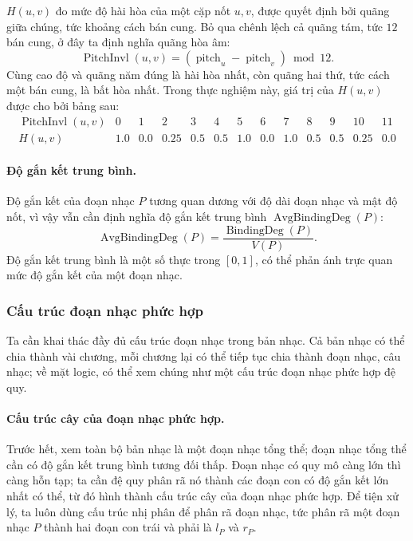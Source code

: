 \documentclass[11pt]{article}
\begin{document}
\(H(u,v)\) đo mức độ hài hòa của một cặp nốt \(u,v\), được quyết định bởi
quãng giữa chúng, tức khoảng cách bán cung. Bỏ qua chênh lệch cả quãng tám,
tức \(12\) bán cung, ở đây ta định nghĩa quãng hòa âm:
\[
  \operatorname{PitchInvl}(u,v)=
  (\operatorname{pitch}_u-\operatorname{pitch}_v)\bmod 12.
\]
Cùng cao độ và quãng năm đúng là hài hòa nhất, còn quãng hai thứ, tức cách
một bán cung, là bất hòa nhất. Trong thực nghiệm này, giá trị của \(H(u,v)\)
được cho bởi bảng sau:
\[
\begin{array}{c|cccccccccccc}
\operatorname{PitchInvl}(u,v) & 0&1&2&3&4&5&6&7&8&9&10&11\\
\hline
H(u,v)&1.0&0.0&0.25&0.5&0.5&1.0&0.0&1.0&0.5&0.5&0.25&0.0
\end{array}
\]

\paragraph{Độ gắn kết trung bình.}
Độ gắn kết của đoạn nhạc \(P\) tương quan dương với độ dài đoạn nhạc và mật
độ nốt, vì vậy vẫn cần định nghĩa độ gắn kết trung bình
\(\operatorname{AvgBindingDeg}(P)\):
\[
  \operatorname{AvgBindingDeg}(P)=
  \frac{\operatorname{BindingDeg}(P)}{V(P)}.
\]
Độ gắn kết trung bình là một số thực trong \([0,1]\), có thể phản ánh trực
quan mức độ gắn kết của một đoạn nhạc.

\subsubsection{Cấu trúc đoạn nhạc phức hợp}

Ta cần khai thác đầy đủ cấu trúc đoạn nhạc trong bản nhạc. Cả bản nhạc có thể
chia thành vài chương, mỗi chương lại có thể tiếp tục chia thành đoạn nhạc,
câu nhạc; về mặt logic, có thể xem chúng như một cấu trúc đoạn nhạc phức hợp
đệ quy.

\paragraph{Cấu trúc cây của đoạn nhạc phức hợp.}
Trước hết, xem toàn bộ bản nhạc là một đoạn nhạc tổng thể; đoạn nhạc tổng thể
cần có độ gắn kết trung bình tương đối thấp. Đoạn nhạc có quy mô càng lớn thì
càng hỗn tạp; ta cần đệ quy phân rã nó thành các đoạn con có độ gắn kết lớn
nhất có thể, từ đó hình thành cấu trúc cây của đoạn nhạc phức hợp. Để tiện xử
lý, ta luôn dùng cấu trúc nhị phân để phân rã đoạn nhạc, tức phân rã một đoạn
nhạc \(P\) thành hai đoạn con trái và phải là \(l_P\) và \(r_P\).
\end{document}
